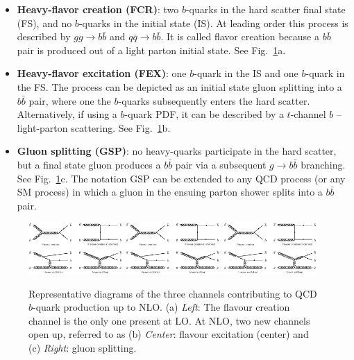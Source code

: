 \begin{itemize}\addtolength{\itemsep}{-0.4\baselineskip}
\item
{\bf Heavy-flavor creation (FCR)}: two $b$-quarks in the hard scatter final state (FS), and no $b$-quarks in the initial state (IS). At leading order this process is described by $gg \rightarrow b\bar{b}$ and  $q\bar{q} \rightarrow b\bar{b}$. It is called flavor creation because a $b\bar{b}$ pair is produced out of a light parton initial state. See Fig.~\ref{fig:qcd_diagrams}a.
\item
{\bf Heavy-flavor excitation (FEX)}: one $b$-quark in the IS and one $b$-quark in the FS.  The process can be depicted as an initial state gluon splitting into a $b\bar{b}$ pair, where one the $b$-quarks subsequently enters the hard scatter. Alternatively, if using a $b$-quark PDF, it can be described by a $t$-channel $b$ -- light-parton scattering.  See Fig.~\ref{fig:qcd_diagrams}b.
\item
{\bf Gluon splitting (GSP)}: no heavy-quarks participate in the hard scatter, but a final state gluon produces a $b\bar{b}$ pair via a subsequent $g \rightarrow b\bar{b}$ branching. See Fig.~\ref{fig:qcd_diagrams}c. The notation GSP can be extended to any QCD process (or any SM process) in which a gluon in the ensuing parton shower splits into a $b\bar{b}$ pair.
\end{itemize}
%
\begin{figure}[h!]
\centering
\includegraphics[width=0.32\textwidth,viewport=0 880 1500 1600,clip]{FIGS/bb_diagrams.jpg}
\includegraphics[width=0.32\textwidth,viewport=0 0 1500 820,clip]{FIGS/bb_diagrams.jpg}
\includegraphics[width=0.32\textwidth,viewport=1600 0 3100 820,clip]{FIGS/bb_diagrams.jpg}
\caption{Representative diagrams of the three channels contributing to QCD $b$-quark production up to NLO. (a) {\em Left}: The flavour creation channel is the only one present at LO. At NLO, two new channels open up, referred to as (b) {\em Center}: flavour excitation (center) and (c) {\em Right}: gluon splitting.}
\label{fig:qcd_diagrams}
\end{figure}
%

